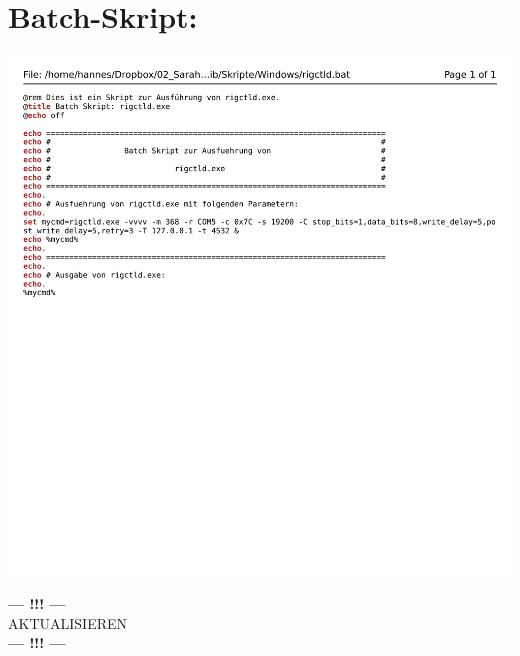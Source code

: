 
\appendix

\chapter{Batch-Skript: }
\label{chap:rigctldbat}

\begin{center}
	\includegraphics[width=1\textwidth]{./appendicies/rigctld-windows}
\end{center}

\begin{center}
	\Large{\textbf{--- !!! ---}\\AKTUALISIEREN\\\textbf{--- !!! ---}}
\end{center}

